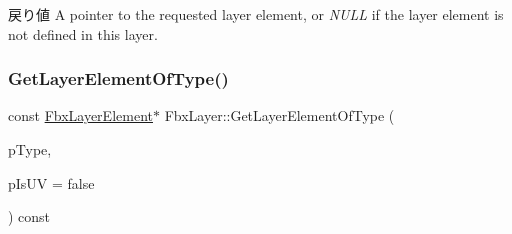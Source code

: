 \begin{DoxyReturn}{戻り値}
A pointer to the requested layer element, or {\itshape N\+U\+LL} if the layer element is not defined in this layer. 
\end{DoxyReturn}
\mbox{\label{class_fbx_layer_a529a1bf508802ecb8f966b65857f96f4}} 
\subsubsection{\texorpdfstring{Get\+Layer\+Element\+Of\+Type()}{GetLayerElementOfType()}\hspace{0.1cm}{\footnotesize\ttfamily [2/2]}}
{\footnotesize\ttfamily const \hyperlink{class_fbx_layer_element}{Fbx\+Layer\+Element}$\ast$ Fbx\+Layer\+::\+Get\+Layer\+Element\+Of\+Type (\begin{DoxyParamCaption}\item[{\hyperlink{class_fbx_layer_element_a8c95c5cd880b56c776acd379bd86f42c}{Fbx\+Layer\+Element\+::\+E\+Type}}]{p\+Type,  }\item[{bool}]{p\+Is\+UV = {\ttfamily false} }\end{DoxyParamCaption}) const}

